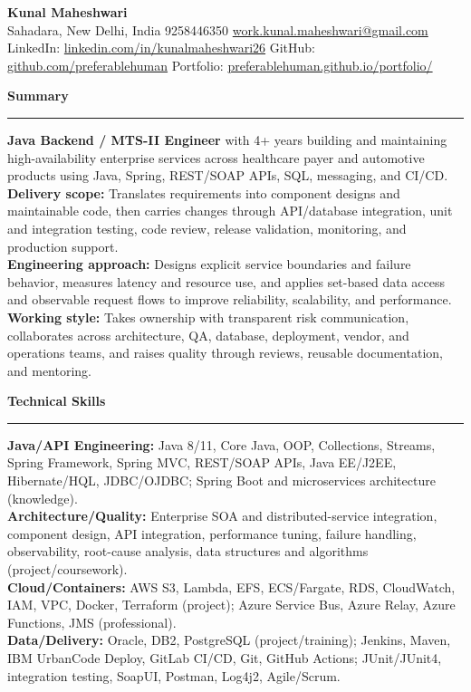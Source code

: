 \documentclass[11pt,letterpaper]{article}
\newcommand{\ressection}[1]{\Needspace{6\baselineskip}\vspace{8pt}\par\textbf{#1}\par\vspace{2pt}\hrule\vspace{5pt}}
\begin{document}
\pagestyle{empty}\raggedright\fontsize{11}{12.5}\selectfont

{\Large \textbf{Kunal Maheshwari}}\\
Sahadara, New Delhi, India \textbar{} 9258446350 \textbar{} \href{mailto:work.kunal.maheshwari@gmail.com}{work.kunal.maheshwari@gmail.com}\\
LinkedIn: \href{https://www.linkedin.com/in/kunalmaheshwari26}{linkedin.com/in/kunalmaheshwari26} \textbar{} GitHub: \href{https://github.com/preferablehuman}{github.com/preferablehuman} \textbar{} Portfolio: \href{https://preferablehuman.github.io/portfolio/}{preferablehuman.github.io/portfolio/}

\ressection{Summary}
\textbf{Java Backend / MTS-II Engineer} with 4+ years building and maintaining high-availability enterprise services across healthcare payer and automotive products using Java, Spring, REST/SOAP APIs, SQL, messaging, and CI/CD.\\[2pt]
\textbf{Delivery scope:} Translates requirements into component designs and maintainable code, then carries changes through API/database integration, unit and integration testing, code review, release validation, monitoring, and production support.\\[2pt]
\textbf{Engineering approach:} Designs explicit service boundaries and failure behavior, measures latency and resource use, and applies set-based data access and observable request flows to improve reliability, scalability, and performance.\\[2pt]
\textbf{Working style:} Takes ownership with transparent risk communication, collaborates across architecture, QA, database, deployment, vendor, and operations teams, and raises quality through reviews, reusable documentation, and mentoring.

\ressection{Technical Skills}
\textbf{Java/API Engineering:} Java 8/11, Core Java, OOP, Collections, Streams, Spring Framework, Spring MVC, REST/SOAP APIs, Java EE/J2EE, Hibernate/HQL, JDBC/OJDBC; Spring Boot and microservices architecture (knowledge).\\
\textbf{Architecture/Quality:} Enterprise SOA and distributed-service integration, component design, API integration, performance tuning, failure handling, observability, root-cause analysis, data structures and algorithms (project/coursework).\\
\textbf{Cloud/Containers:} AWS S3, Lambda, EFS, ECS/Fargate, RDS, CloudWatch, IAM, VPC, Docker, Terraform (project); Azure Service Bus, Azure Relay, Azure Functions, JMS (professional).\\
\textbf{Data/Delivery:} Oracle, DB2, PostgreSQL (project/training); Jenkins, Maven, IBM UrbanCode Deploy, GitLab CI/CD, Git, GitHub Actions; JUnit/JUnit4, integration testing, SoapUI, Postman, Log4j2, Agile/Scrum.
\end{document}
